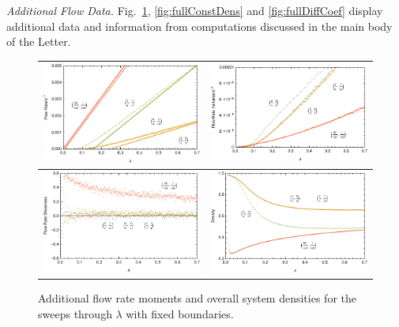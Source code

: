 \documentclass[
reprint,
 amsmath,amssymb,
 aps,
 prl,
]{revtex4-1}
\begin{document}
\textit{Additional Flow Data.} Fig.~\ref{fig:fullLambdaScans}, \ref{fig:fullConstDens} and \ref{fig:fullDiffCoef} display additional data and information from computations discussed in the main body of the Letter.
\begin{figure}[h!]
\vspace{1em}
\caption{\label{fig:fullLambdaScans} Additional flow rate moments and overall system densities for the sweeps through $\lambda$ with fixed boundaries.}
\begin{center}
 \begin{tabular}{c|c}
    \includegraphics[width=0.5\linewidth]{images/newFlowMean} & \includegraphics[width=0.5\linewidth]{images/newFlowVar} \\
    \hline
    \includegraphics[width=0.5\linewidth]{images/newFlowSkew} & \includegraphics[width=0.5\linewidth]{images/newDens} \\
    \end{tabular}
\end{center}
    \vspace{-0em}
\end{figure}
\end{document}
